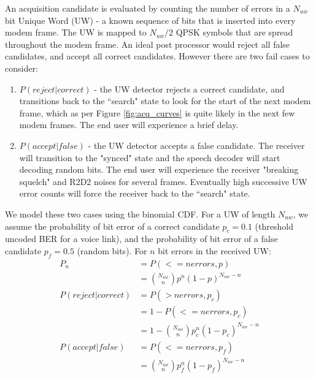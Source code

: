 \documentclass{article}
\begin{document}
An acquisition candidate is evaluated by counting the number of errors in a $N_{uw}$ bit Unique Word (UW) - a known sequence of bits that is inserted into every modem frame.  The UW is mapped to $N_{uw}/2$ QPSK symbols that are spread throughout the modem frame.  An ideal post processor would reject all false candidates, and accept all correct candidates.  However there are two fail cases to consider:
\begin{enumerate}
\item $P(reject|correct)$ - the UW detector rejects a correct candidate, and transitions back to the ``search" state to look for the start of the next modem frame, which as per Figure \ref{fig:acq_curves} is quite likely in the next few modem frames.  The end user will experience a brief delay.
\item $P(accept|false)$ - the UW detector accepts a false candidate.  The receiver will transition to the "synced" state and the speech decoder will start decoding random bits.  The end user will experience the receiver "breaking squelch" and R2D2 noises for several frames. Eventually high successive UW error counts will force the receiver back to the ``search" state.
\end{enumerate}
We model these two cases using the binomial CDF.  For a UW of length $N_{uw}$, we assume the probability of bit error of a correct candidate $p_c=0.1$ (threshold uncoded BER for a voice link), and the probability of bit error of a false candidate $p_f=0.5$ (random bits).  For $n$ bit errors in the received UW:
\begin{equation}
\begin{split}
P_n &= P(<=n errors, p) \\
    &= {N_{uw} \choose n} p^n (1-p)^{N_{uw}-n} \\
P(reject|correct) &= P(> n errors, p_c) \\
                  &= 1 - P(<=n errors, p_c) \\
                  &= 1 - {N_{uw} \choose n} p_c^n (1-p_c)^{N_{uw}-n} \\
P(accept|false)   &= P(<= n errors, p_f) \\
                  &= {N_{uw} \choose n} p_f^n (1-p_f)^{N_{uw}-n}
\end{split}
\end{equation}
\end{document}
